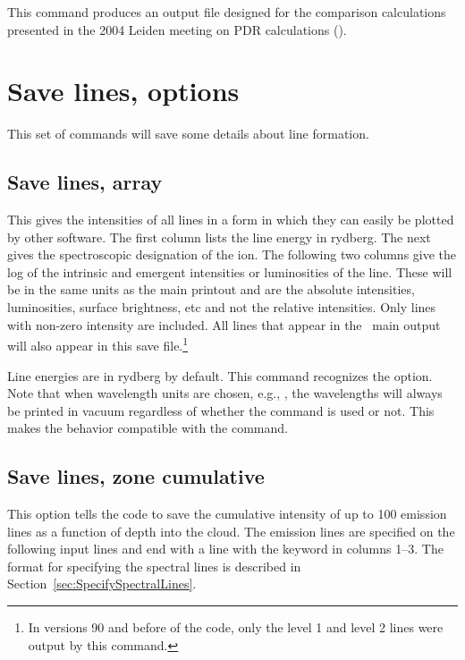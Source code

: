 This command produces an output file designed for the comparison
calculations presented in the 2004 Leiden meeting on PDR calculations
(\citealp{Roellig2007}).

\section{Save lines, options}

This set of commands will save some details about line formation.

\subsection{Save lines, array}

This gives the intensities of all lines in a form in which they can easily
be plotted by other software.  The first column lists the line energy in
rydberg.  The next gives the spectroscopic designation of the ion.  The
following two columns give the log of the intrinsic and emergent intensities
or luminosities of the line.  These will be in the same units as the main printout
and are the absolute intensities, luminosities, surface brightness, etc and not the 
relative intensities.
Only lines with non-zero intensity are included.
All lines that appear in the \Cloudy\ main output will also appear in
this save file.\footnote{In versions 90 and before of the code, only the level 1 and level
2 lines were output by this command.}

Line energies are in rydberg by default.  This command recognizes the
 option.  Note that when wavelength units are chosen, e.g.,
, the wavelengths will always be printed in vacuum regardless
of whether the  command is used or not.  This makes
the behavior compatible with the  command.

\subsection{Save lines, zone cumulative}

This option tells the code to save the cumulative intensity
of up to 100 emission lines as a function of depth into the cloud.  The
emission lines are specified on the following input lines and end with a
line with the keyword  in columns 1--3.
The format for specifying the spectral lines is described in Section~\ref{sec:SpecifySpectralLines}.

